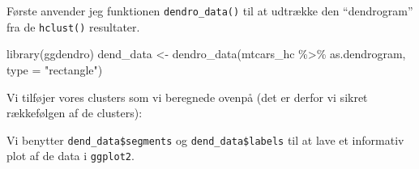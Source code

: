 \documentclass[
]{book}
\newenvironment{Shaded}{\begin{snugshade}}{\end{snugshade}}
\newcommand{\AttributeTok}[1]{\textcolor[rgb]{0.77,0.63,0.00}{#1}}
\newcommand{\DecValTok}[1]{\textcolor[rgb]{0.00,0.00,0.81}{#1}}
\newcommand{\FunctionTok}[1]{\textcolor[rgb]{0.00,0.00,0.00}{#1}}
\newcommand{\NormalTok}[1]{#1}
\newcommand{\OtherTok}[1]{\textcolor[rgb]{0.56,0.35,0.01}{#1}}
\newcommand{\SpecialCharTok}[1]{\textcolor[rgb]{0.00,0.00,0.00}{#1}}
\newcommand{\StringTok}[1]{\textcolor[rgb]{0.31,0.60,0.02}{#1}}
\begin{document}
Første anvender jeg funktionen \texttt{dendro\_data()} til at udtrække den ``dendrogram'' fra de \texttt{hclust()} resultater.

\begin{Shaded}
\begin{Highlighting}[]
\FunctionTok{library}\NormalTok{(ggdendro)}
\NormalTok{dend\_data }\OtherTok{\textless{}{-}} \FunctionTok{dendro\_data}\NormalTok{(mtcars\_hc }\SpecialCharTok{\%\textgreater{}\%}\NormalTok{ as.dendrogram, }\AttributeTok{type =} \StringTok{"rectangle"}\NormalTok{)}
\end{Highlighting}
\end{Shaded}

Vi tilføjer vores clusters som vi beregnede ovenpå (det er derfor vi sikret rækkefølgen af de clusters):

\begin{Shaded}
\end{Shaded}

Vi benytter \texttt{dend\_data\$segments} og \texttt{dend\_data\$labels} til at lave et informativ plot af de data i \texttt{ggplot2}.

\begin{Shaded}
\end{Shaded}
\end{document}

